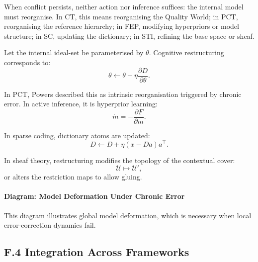\documentclass[11pt,a4paper,twoside]{article}
\begin{document}
When conflict persists, neither action nor inference suffices: the internal model must reorganise. In CT, this means reorganising the Quality World; in PCT, reorganising the reference hierarchy; in FEP, modifying hyperpriors or model structure; in SC, updating the dictionary; in STI, refining the base space or sheaf.

Let the internal ideal-set be parameterised by $\theta$. Cognitive restructuring corresponds to:
\[
\theta \leftarrow \theta - \eta \frac{\partial D}{\partial \theta}.
\]

In PCT, Powers described this as intrinsic reorganisation triggered by chronic error. In active inference, it is hyperprior learning:
\[
\dot{m} = -\frac{\partial F}{\partial m}.
\]

In sparse coding, dictionary atoms are updated:
\[
D \leftarrow D + \eta (x - Da)a^\top.
\]

In sheaf theory, restructuring modifies the topology of the contextual cover:
\[
\mathcal{U} \mapsto \mathcal{U}',
\]
or alters the restriction maps to allow gluing.

\paragraph{Diagram: Model Deformation Under Chronic Error}

\begin{center}
\end{center}

This diagram illustrates global model deformation, which is necessary when local error-correction dynamics fail.

\subsection*{F.4 Integration Across Frameworks}
\end{document}
